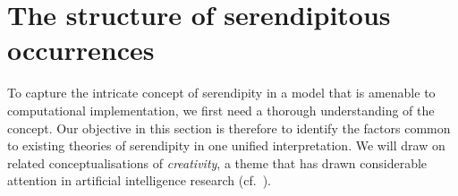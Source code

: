 \section{The structure of serendipitous occurrences}
\label{sec:literature-review}

To capture the intricate concept of serendipity in a model that is amenable to computational implementation, we first need a thorough understanding of the concept.  Our objective in this section is therefore to identify the factors common to existing theories of serendipity in one unified interpretation.  We will draw on related conceptualisations of \emph{creativity}, a theme that has drawn considerable attention in artificial intelligence research (cf.~\cite{boden1998creativity,colton2009computational,mccormack2012computers}).  



